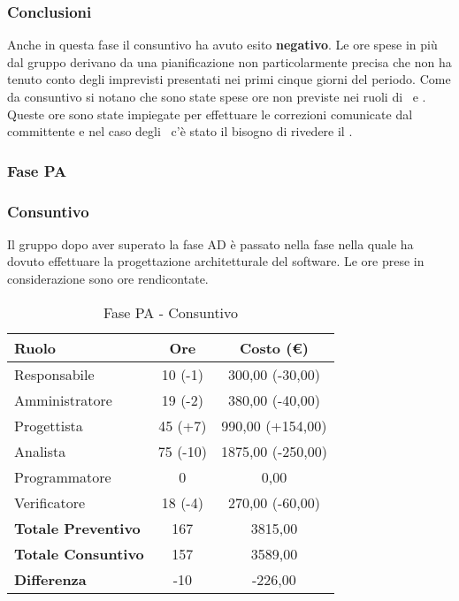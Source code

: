 \documentclass[../PianoProgetto.tex]{subfiles}
\begin{document}
	\subsubsection{Conclusioni}	
     Anche in questa fase il consuntivo ha avuto esito \textbf{negativo}.
     Le ore spese in più dal gruppo derivano da una pianificazione non particolarmente precisa che non ha tenuto conto degli imprevisti presentati nei primi cinque giorni del periodo.
     Come da consuntivo si notano che sono state spese ore non previste nei ruoli di \amministratore\ e \analista. Queste ore sono state impiegate per effettuare le correzioni comunicate dal committente e nel caso degli \amministratori\ c'è stato il bisogno di rivedere il \pianodiqualifica. 
	
    \subsubsection{Fase PA}
	\subsubsection{Consuntivo}
	Il gruppo dopo aver superato la fase AD è passato nella fase nella quale ha dovuto effettuare la progettazione architetturale del software\g. Le ore prese in considerazione sono ore rendicontate. 
	
	\begin{table}[h]
		\centering
		\begin{tabular}{l * {2}{c}}
			\toprule
			\textbf{Ruolo} & \textbf{Ore} & \textbf{Costo (\euro{})} \\
			\midrule
			Responsabile &		10 (-1) & 300,00  (-30,00) \\
			Amministratore &	19 (-2) & 380,00  (-40,00) \\
			Progettista & 		45 (+7) & 990,00  (+154,00)\\
			Analista & 			75	(-10)	& 1875,00   (-250,00)       \\
			Programmatore & 	0		& 0,00 				\\
			Verificatore & 		18 (-4) & 270,00 (-60,00)	\\
			\midrule
			\textbf{Totale Preventivo} & 167
			& 3815,00
			\\		
			\textbf{Totale Consuntivo} & 157 & 3589,00 
			\\
			\midrule
			\textbf{Differenza} & -10 & -226,00 \\
			\bottomrule
		\end{tabular}
		
		\caption{Fase PA - Consuntivo}
		\label{tab:consuntivoPA}
		
	\end{table}		
	
\end{document}
